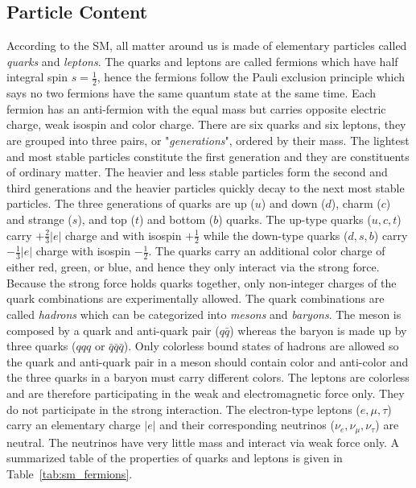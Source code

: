 \subsection{Particle Content}
\label{subsec:sm_particle_content}
According to the SM, all matter around us is made of elementary particles called \textit{quarks} and \textit{leptons}.
The quarks and leptons are called fermions which have half integral spin $s=\frac{1}{2}$, hence the fermions follow the Pauli exclusion principle which says no two fermions have the same quantum state at the same time.
Each fermion has an anti-fermion with the equal mass but carries opposite electric charge, weak isospin and color charge.
There are six quarks and six leptons, they are grouped into three pairs, or "\textit{generations}", ordered by their mass.
The lightest and most stable particles constitute the first generation and they are constituents of ordinary matter.
The heavier and less stable particles form the second and third generations and the heavier particles quickly decay to the next most stable particles.
The three generations of quarks are up ($u$) and down ($d$), charm ($c$) and strange ($s$), and top ($t$) and bottom ($b$) quarks.
The up-type quarks ($u, c, t$) carry $+\frac{2}{3}|e|$ charge and with isospin $+\frac{1}{2}$ while the down-type quarks ($d, s, b$) carry $-\frac{1}{3}|e|$ charge with isospin $-\frac{1}{2}$.
The quarks carry an additional color charge of either red, green, or blue, and hence they only interact via the strong force.
Because the strong force holds quarks together, only non-integer charges of the quark combinations are experimentally allowed.
The quark combinations are called \textit{hadrons} which can be categorized into \textit{mesons} and \textit{baryons}.
The meson is composed by a quark and anti-quark pair ($q\bar{q}$) whereas the baryon is made up by three quarks ($qqq$ or $\bar{q}\bar{q}\bar{q}$).
Only colorless bound states of hadrons are allowed so the quark and anti-quark pair in a meson should contain color and anti-color and the three quarks in a baryon must carry different colors.
The leptons are colorless and are therefore participating in the weak and electromagnetic force only. 
They do not participate in the strong interaction.
The electron-type leptons ($e, \mu, \tau$) carry an elementary charge $|e|$ and their corresponding neutrinos ($\nu_{e}, \nu_{\mu}, \nu_{\tau}$) are neutral.
The neutrinos have very little mass and interact via weak force only.
A summarized table of the properties of quarks and leptons is given in Table~\ref{tab:sm_fermions}.


